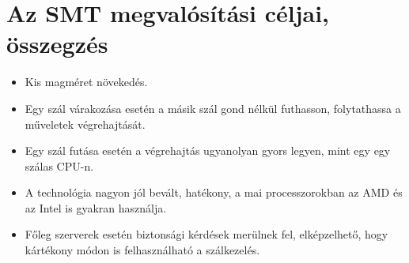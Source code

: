 \section{Az SMT megvalósítási céljai, összegzés}
\begin{itemize}
    \item Kis magméret növekedés.
    \item Egy szál várakozása esetén a másik szál gond nélkül futhasson, folytathassa a műveletek végrehajtását.
    \item Egy szál futása esetén a végrehajtás ugyanolyan gyors legyen, mint egy egy szálas CPU-n.
    \item A technológia nagyon jól bevált, hatékony, a mai processzorokban az AMD és az Intel is gyakran használja.
    \item Főleg szerverek esetén biztonsági kérdések merülnek fel, elképzelhető, hogy kártékony módon is felhasználható a szálkezelés.
\end{itemize}